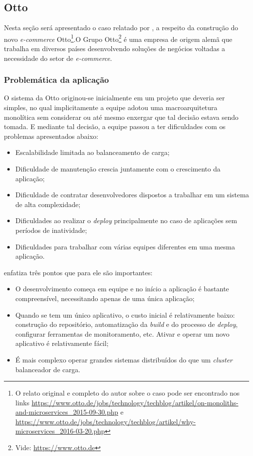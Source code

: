 \subsection{Otto}

Nesta seção será apresentado o caso relatado por  , a
respeito da construção do novo \textit{e-commerce} Otto\footnote{O relato original e completo do autor
sobre o caso pode ser encontrado nos links
\url{https://www.otto.de/jobs/technology/techblog/artikel/on-monoliths-and-microservices_2015-09-30.php}
e \url{https://www.otto.de/jobs/technology/techblog/artikel/why-microservices_2016-03-20.php}}.O Grupo
Otto\footnote{Vide: \url{https://www.otto.de}} é uma empresa de origem alemã que trabalha em diversos países
desenvolvendo soluções de negócios voltadas a necessidade do setor de \textit{e-commerce}.

\subsubsection{Problemática da aplicação}

O sistema da Otto originou-se inicialmente em um projeto que deveria ser simples, no qual
implicitamente a equipe adotou uma macroarquitetura monolítica sem considerar ou até mesmo enxergar
que tal decisão estava sendo tomada. E mediante tal decisão, a equipe passou a ter dificuldades
com os problemas apresentados abaixo:

\begin{itemize}
    \item Escalabilidade limitada ao balanceamento de carga;
    \item Dificuldade de manutenção crescia juntamente com o crescimento da aplicação;
    \item Dificuldade de contratar desenvolvedores dispostos a trabalhar em um sistema de alta
        complexidade;
    \item Dificuldades ao realizar o \textit{deploy} principalmente no caso de aplicações sem
        períodos de inatividade;
    \item Dificuldades para trabalhar com várias equipes diferentes em uma mesma aplicação.
\end{itemize}

 enfatiza três pontos que para ele são importantes:

\begin{itemize}
    \item O desenvolvimento começa em equipe e no início a aplicação é bastante compreensível,
        necessitando apenas de uma única aplicação;
    \item Quando se tem um único aplicativo, o custo inicial é relativamente baixo: construção do
        repositório, automatização da \textit{build} e do processo de \textit{deploy}, configurar
        ferramentas de monitoramento, etc. Ativar e operar um novo aplicativo é relativamente fácil;
    \item É mais complexo operar grandes sistemas distribuídos do que um \textit{cluster}
        balanceador de carga.
\end{itemize}

